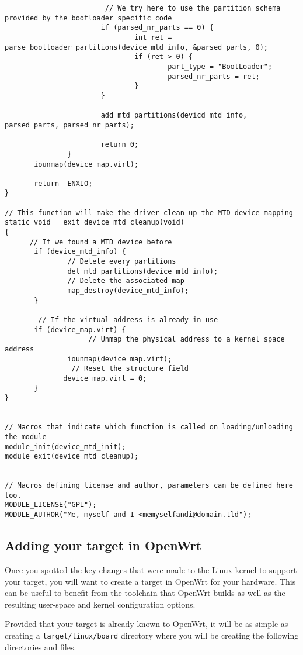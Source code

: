 \begin{verbatim}
						// We try here to use the partition schema provided by the bootloader specific code
                       if (parsed_nr_parts == 0) {
                               int ret = parse_bootloader_partitions(device_mtd_info, &parsed_parts, 0);
                               if (ret > 0) {
                                       part_type = "BootLoader";
                                       parsed_nr_parts = ret;
                               }
                       }

                       add_mtd_partitions(devicd_mtd_info, parsed_parts, parsed_nr_parts);

                       return 0;
               }
       iounmap(device_map.virt);

       return -ENXIO;
}

// This function will make the driver clean up the MTD device mapping
static void __exit device_mtd_cleanup(void)
{
	  // If we found a MTD device before
       if (device_mtd_info) {
			   // Delete every partitions
               del_mtd_partitions(device_mtd_info);
			   // Delete the associated map
               map_destroy(device_mtd_info);
       }
	
		// If the virtual address is already in use
       if (device_map.virt) {
					// Unmap the physical address to a kernel space address
               iounmap(device_map.virt);
				// Reset the structure field
              device_map.virt = 0;
       }
}


// Macros that indicate which function is called on loading/unloading the module
module_init(device_mtd_init);
module_exit(device_mtd_cleanup);


// Macros defining license and author, parameters can be defined here too.
MODULE_LICENSE("GPL");
MODULE_AUTHOR("Me, myself and I <memyselfandi@domain.tld");
\end{verbatim}

\subsection{Adding your target in OpenWrt}

Once you spotted the key changes that were made to the Linux kernel
to support your target, you will want to create a target in OpenWrt
for your hardware. This can be useful to benefit from the toolchain
that OpenWrt builds as well as the resulting user-space and kernel
configuration options.

Provided that your target is already known to OpenWrt, it will be
as simple as creating a \texttt{target/linux/board} directory
where you will be creating the following directories and files.

